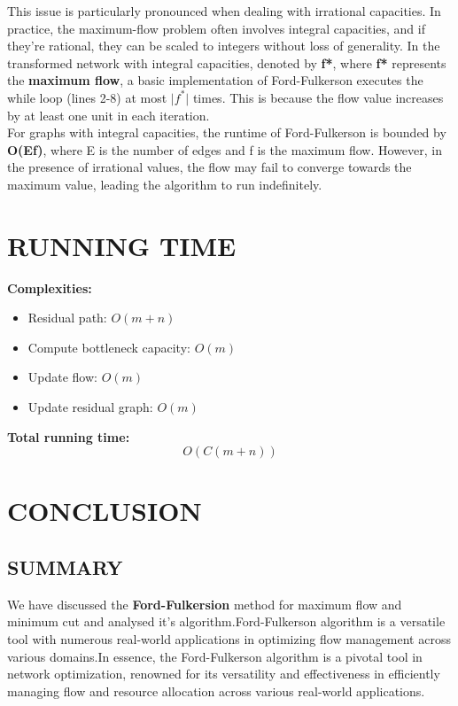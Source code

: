 \documentclass{article}
\begin{document}
{{\vspace{0.2cm}
This issue is particularly pronounced when dealing with irrational capacities. In practice, the maximum-flow problem often involves integral capacities, and if they're rational, they can be scaled to integers without loss of generality. In the transformed network with integral capacities, denoted by \textbf{f*}, where\textbf{ f*} represents the \textbf{maximum flow}, a basic implementation of Ford-Fulkerson executes the while loop (lines 2-8) at most \textbf{$\lvert f^* \rvert$} times. This is because the flow value increases by at least one unit in each iteration. \\

\vspace{0.2cm}
For graphs with integral capacities, the runtime of Ford-Fulkerson is bounded by \textbf{O(Ef)}, where E is the number of edges and f is the maximum flow. However, in the presence of irrational values, the flow may fail to converge towards the maximum value, leading the algorithm to run indefinitely.}
\vspace{1cm}

\section{RUNNING TIME}
\textbf{Complexities:}
\begin{itemize}
    \item Residual path: $O(m+n)$
    \item Compute bottleneck capacity: $O(m)$
    \item Update flow: $O(m)$
    \item Update residual graph: $O(m)$
\end{itemize}
\vspace{0.4cm}
\textbf{Total running time:}
\[
O(C(m+n))
\]
\pagebreak

\section{CONCLUSION}
\vspace{0.5cm}
\subsection{\textbf{SUMMARY}}
{\fontsize{15}{15}\selectfont
We have discussed the \textbf{Ford-Fulkersion} method for maximum flow and minimum cut and analysed it's algorithm.Ford-Fulkerson algorithm is a versatile tool with numerous real-world applications in optimizing flow management across various domains.In essence, the Ford-Fulkerson algorithm is a pivotal tool in network optimization, renowned for its versatility and effectiveness in efficiently managing flow and resource allocation across various real-world applications.}

}
\end{document}
